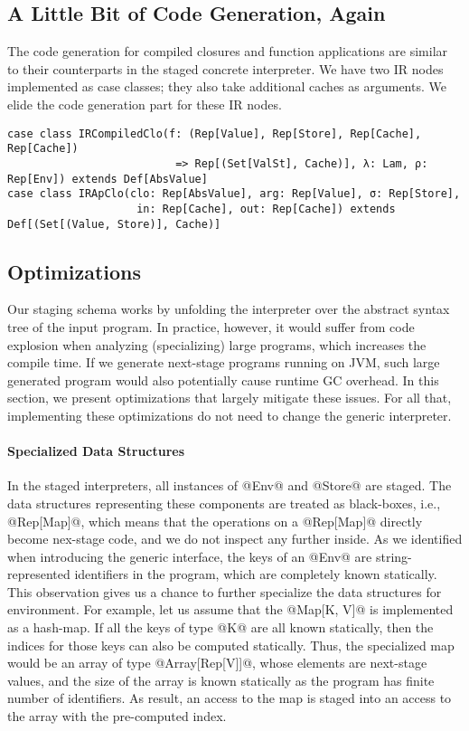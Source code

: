 \subsection{A Little Bit of Code Generation, Again}
The code generation for compiled closures and function applications are similar
to their counterparts in the staged concrete interpreter. We have two IR nodes
implemented as case classes; they also take additional caches as arguments. We
elide the code generation part for these IR nodes.
\begin{lstlisting}
case class IRCompiledClo(f: (Rep[Value], Rep[Store], Rep[Cache], Rep[Cache])
                          => Rep[(Set[ValSt], Cache)], λ: Lam, ρ: Rep[Env]) extends Def[AbsValue]
case class IRApClo(clo: Rep[AbsValue], arg: Rep[Value], σ: Rep[Store],
                    in: Rep[Cache], out: Rep[Cache]) extends Def[(Set[(Value, Store)], Cache)]
\end{lstlisting}

\subsection{Optimizations} \label{staged_ds}

Our staging schema works by unfolding the interpreter over the abstract syntax
tree of the input program. In practice, however, it would suffer from code
explosion when analyzing (specializing) large programs, which increases the
compile time. If we generate next-stage programs running on JVM, such large
generated program would also potentially cause runtime GC overhead. In this
section, we present optimizations that largely mitigate these issues. For all
that, implementing these optimizations do not need to change the generic
interpreter.

\paragraph{Specialized Data Structures}

In the staged interpreters, all instances of @Env@ and @Store@ are staged. The
data structures representing these components are treated as black-boxes, i.e.,
@Rep[Map]@, which means that the operations on a @Rep[Map]@ directly become
nex-stage code, and we do not inspect any further inside. As we identified when
introducing the generic interface, the keys of an @Env@ are string-represented
identifiers in the program, which are completely known statically. This
observation gives us a chance to further specialize the data structures for environment.
For example, let us assume that the @Map[K, V]@ is implemented as a hash-map.
If all the keys of type @K@ are all known statically, then the indices for
those keys can also be computed statically. Thus, the specialized map would be
an array of type @Array[Rep[V]]@, whose elements are next-stage values, and the
size of the array is known statically as the program has finite number of
identifiers. As result, an access to the map is staged into an access to the array
with the pre-computed index.

